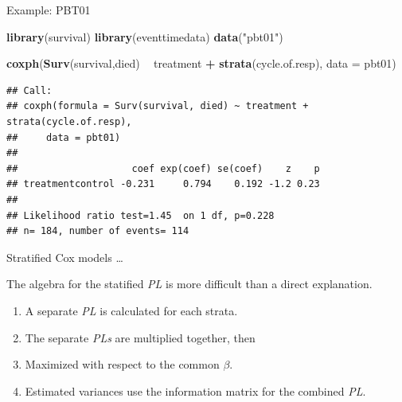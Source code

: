 \documentclass[ignorenonframetext,]{beamer}
\newenvironment{Shaded}{\begin{snugshade}}{\end{snugshade}}
\newcommand{\DataTypeTok}[1]{\textcolor[rgb]{0.13,0.29,0.53}{#1}}
\newcommand{\KeywordTok}[1]{\textcolor[rgb]{0.13,0.29,0.53}{\textbf{#1}}}
\newcommand{\NormalTok}[1]{#1}
\newcommand{\OperatorTok}[1]{\textcolor[rgb]{0.81,0.36,0.00}{\textbf{#1}}}
\newcommand{\StringTok}[1]{\textcolor[rgb]{0.31,0.60,0.02}{#1}}
\providecommand{\tightlist}{%
  \setlength{\itemsep}{0pt}\setlength{\parskip}{0pt}}
\begin{document}
\begin{frame}[fragile]{%
\protect\hypertarget{example-pbt01}{%
Example: PBT01}}

\scriptsize

\begin{Shaded}
\begin{Highlighting}[]
\KeywordTok{library}\NormalTok{(survival)}
\KeywordTok{library}\NormalTok{(eventtimedata)}
\KeywordTok{data}\NormalTok{(}\StringTok{"pbt01"}\NormalTok{)}

\KeywordTok{coxph}\NormalTok{(}\KeywordTok{Surv}\NormalTok{(survival,died) }\OperatorTok{~}\StringTok{ }\NormalTok{treatment }\OperatorTok{+}\StringTok{ }\KeywordTok{strata}\NormalTok{(cycle.of.resp),}
              \DataTypeTok{data =}\NormalTok{ pbt01)}
\end{Highlighting}
\end{Shaded}

\begin{verbatim}
## Call:
## coxph(formula = Surv(survival, died) ~ treatment + strata(cycle.of.resp), 
##     data = pbt01)
## 
##                    coef exp(coef) se(coef)    z    p
## treatmentcontrol -0.231     0.794    0.192 -1.2 0.23
## 
## Likelihood ratio test=1.45  on 1 df, p=0.228
## n= 184, number of events= 114
\end{verbatim}

\end{frame}

\begin{frame}{%
\protect\hypertarget{stratified-cox-models-1}{%
Stratified Cox models \ldots}}

The algebra for the statified \emph{PL} is more difficult than a direct
explanation.

\begin{enumerate}
[1.]
\tightlist
\item
  A separate \emph{PL} is calculated for each strata.\\
\item
  The separate \emph{PLs} are multiplied together, then
\item
  Maximized with respect to the common \(\beta\).
\item
  Estimated variances use the information matrix for the combined
  \emph{PL}.
\end{enumerate}

\end{frame}
\end{document}
